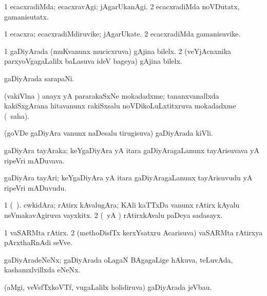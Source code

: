 {\bentry
{} 
\gl{\kirxvi}
\expl{}
\bmng
\bnum
\num{1} ecacxradiMda; ecacxravAgi; jAgarUkanAgi. 
\num{2} ecacxradiMda noVDutatx, gamanisutatx. 
\enum
\emng
\eentry

\bentry
{} 
\gl{\nA}
\expl{}
\bmng
\bnum
\num{1} ecacxra; ecacxradiMdiruvike; jAgarUkate. 
\num{2} ecacxradiMda gamanisuvike. 
\enum
\emng
\eentry

\bentry
{} 
\gl{\nA}
\expl{}
\bmng
\bnum
\num{1} gaDiyArada (muKvanunx mucicxruva) gAjina bilelx. 
\num{2} (veYjAcnxnika parxyoVgagaLalilx baLasuva ideV bageya) gAjina bilelx. 
\enum
\emng
\eentry

\bentry
{} 
\gl{\nA}
\expl{}
\bmng
gaDiyArada sarapaNi. 
\emng
\eentry

\bentry
{} 
\gl{\nA}
\expl{}
\bmng
(vakiVlna \vi) anayx yA pararakaSxNe mokadadxme; tananxvanallxda kakiSxgArana hitavanunx rakiSxsalu noVDikoLuLxtitxruva mokadadxme (\rUpa\ saha). 
\emng
\eentry

\bentry
{} 
\gl{\nA}
\expl{}
\bmng
(goVDe gaDiyAra \mo vanunx naDesalu tirugisuva) gaDiyArada kiVli. 
\emng
\eentry

\bentry
{} 
\gl{\nA}
\expl{}
\bmng
gaDiyAra tayAraka; keYgaDiyAra yA itara gaDiyAragaLanunx tayArisuvava yA ripeVri mADuvava. 
\emng
\eentry

\bentry
{} 
\gl{\nA}
\expl{}
\bmng
gaDiyAra tayAri; keYgaDiyAra yA itara gaDiyAragaLanunx tayArisuvudu yA ripeVri mADuvudu. 
\emng
\eentry

 \bentry
{} 
\gl{\nA}
\expl{}
\bmng
\bnum
\num{1} (\bava\ ). cwkidAra; rAtirx kAvalugAra; KAli kaTTxDa \mo vanunx rAtirx kAyalu neVmakavAgiruva vayxkitx. 
\num{2} (\pArxparx\ yA \ca) rAtirxkAvalu paDeya sadasayx. 
\enum
\emng
\eentry

\bentry
{} 
\gl{\nA}
\expl{}
\bmng
\bnum
\num{1} vaSARMta rAtirx. 
\num{2} (methoDisfTx kerxYsatxru Acarisuva) vaSARMta rAtirxya pArxthaRnAdi seVve. 
\enum
\emng
\eentry

\bentry
{} 
\gl{\nA}
\expl{}
\bmng
gaDiyAradeNeNx; gaDiyArada oLagaN BAgagaLige hAkuva, teLuvAda, kashamxlvillxda eNeNx. 
\emng
\eentry

\bentry
{} 
\gl{\nA}
\expl{}
\bmng
(aMgi, veVsfTxkoVTf, \mo vugaLalilx holidiruva) gaDiyArada jeVbau. 
\emng
\eentry

}
